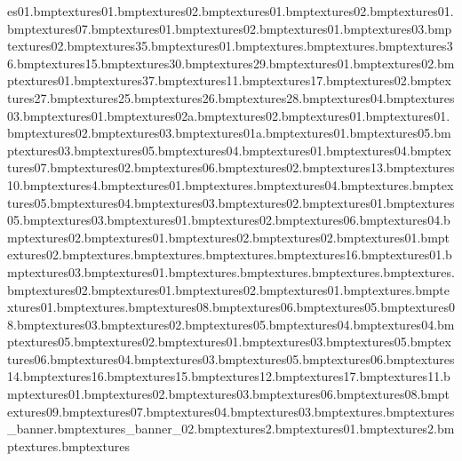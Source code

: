 es\winstar01.bmp textures\winhandle01.bmp textures\winblind02.bmp textures\winblind01.bmp textures\winexplan02.bmp textures\winexplan01.bmp textures\shopdough07.bmp textures\shopdough01.bmp textures\shopdough02.bmp textures\shopbed01.bmp textures\shopbed03.bmp textures\shopbed02.bmp textures\ceramictile35.bmp textures\shoptv01.bmp textures\tvside.bmp textures\tvtop.bmp textures\ceramictile36.bmp textures\leading15.bmp textures\ceramictile30.bmp textures\ceramictile29.bmp textures\shopexplode01.bmp textures\wineon02.bmp textures\wineon01.bmp textures\ceramictile37.bmp textures\leading11.bmp textures\leading17.bmp textures\shopdanger02.bmp textures\ceramictile27.bmp textures\ceramictile25.bmp textures\ceramictile26.bmp textures\ceramictile28.bmp textures\tv04.bmp textures\tv03.bmp textures\tv01.bmp textures\tv02a.bmp textures\tv02.bmp textures\glassblue01.bmp textures\glasslogo01.bmp textures\glasslogo02.bmp textures\glasslogo03.bmp textures\voltage01a.bmp textures\shoptvstep01.bmp textures\shopbowl05.bmp textures\shopsgensign03.bmp textures\shopsgensign05.bmp textures\shopsgensign04.bmp textures\shopsgensign01.bmp textures\shopbed04.bmp textures\shopsgensign07.bmp textures\shopsgensign02.bmp textures\shopsgensign06.bmp textures\shopblackfloor02.bmp textures\chubcons13.bmp textures\ceramictile10.bmp textures\toyconnect4.bmp textures\toywall01.bmp textures\toyyosemite.bmp textures\toywall04.bmp textures\toybricks.bmp textures\racetrak05.bmp textures\racetrak04.bmp textures\racetrak03.bmp textures\racetrak02.bmp textures\glasstriple01.bmp textures\toyblox05.bmp textures\toyblox03.bmp textures\toyblox01.bmp textures\toyblox02.bmp textures\toyblox06.bmp textures\toyblox04.bmp textures\toypopup02.bmp textures\toycastle01.bmp textures\toycastle02.bmp textures\woodblock02.bmp textures\woodblock01.bmp textures\jhutboard02.bmp textures\chain.bmp textures\light.bmp textures\tv.bmp textures\sportsnfl16.bmp textures\samcake01.bmp textures\signsports03.bmp textures\signtaxi01.bmp textures\samtea.bmp textures\signcereal.bmp textures\signbeans.bmp textures\martmat.bmp textures\martcheck02.bmp textures\posterfood01.bmp textures\samcan02.bmp textures\samcan01.bmp textures\samcerealboxsides.bmp textures\samcerealbox01.bmp textures\tennisball.bmp textures\shopdough08.bmp textures\shopblackfloor06.bmp textures\shopblackfloor05.bmp textures\shopblackfloor08.bmp textures\posterfood03.bmp textures\posterfood02.bmp textures\posterfood05.bmp textures\posterfood04.bmp textures\signsmart04.bmp textures\signsmart05.bmp textures\signsmart02.bmp textures\signsmart01.bmp textures\signsmart03.bmp textures\shopdough05.bmp textures\shopdough06.bmp textures\shopdough04.bmp textures\shopdough03.bmp textures\shopbed05.bmp textures\shopbed06.bmp textures\chubcons14.bmp textures\chubcons16.bmp textures\chubcons15.bmp textures\chubcons12.bmp textures\chubcons17.bmp textures\chubcons11.bmp textures\shopbowl01.bmp textures\shopbowl02.bmp textures\shopbowl03.bmp textures\shopbowl06.bmp textures\shopbowl08.bmp textures\shopbowl09.bmp textures\shopbowl07.bmp textures\shopbowl04.bmp textures\shopblackfloor03.bmp textures\blackholetex.bmp textures\depts_banner.bmp textures\depts_banner_02.bmp textures\electricwindow2.bmp textures\glassstripe01.bmp textures\supermarketwindow2.bmp textures\glassclear.bmp textures\sportsshopwi